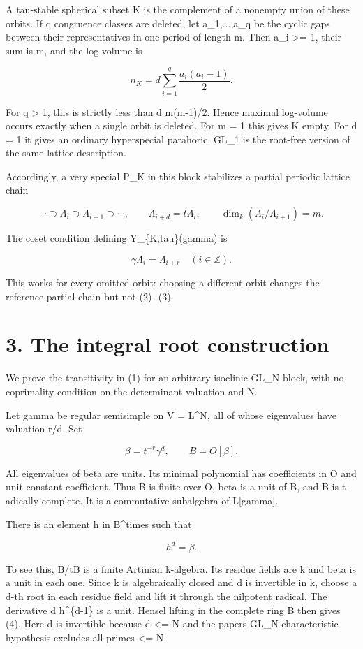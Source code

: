 \documentclass[11pt,a4paper]{article}
\begin{document}
A tau-stable spherical subset K is the complement of a nonempty union of
these orbits. If q congruence classes are deleted, let a\_1,...,a\_q be
the cyclic gaps between their representatives in one period of length m.
Then a\_i \textgreater= 1, their sum is m, and the log-volume is

\[
 n_K=d\sum_{i=1}^q\frac{a_i(a_i-1)}2.
\]

For q \textgreater{} 1, this is strictly less than d m(m-1)/2. Hence
maximal log-volume occurs exactly when a single orbit is deleted. For m
= 1 this gives K empty. For d = 1 it gives an ordinary hyperspecial
parahoric. GL\_1 is the root-free version of the same lattice
description.

Accordingly, a very special P\_K in this block stabilizes a partial
periodic lattice chain

\[
 \cdots\supset\Lambda_i\supset\Lambda_{i+1}\supset\cdots,
 \qquad\Lambda_{i+d}=t\Lambda_i,
 \qquad\dim_k(\Lambda_i/\Lambda_{i+1})=m.
 \tag{2}
\]

The coset condition defining Y\_\{K,tau\}(gamma) is

\[
 \gamma\Lambda_i=\Lambda_{i+r}\quad(i\in\mathbb Z).
 \tag{3}
\]

This works for every omitted orbit: choosing a different orbit changes
the reference partial chain but not (2)-\/-(3).

\section{3. The integral root
construction}\label{the-integral-root-construction}

We prove the transitivity in (1) for an arbitrary isoclinic GL\_N block,
with no coprimality condition on the determinant valuation and N.

Let gamma be regular semisimple on V = L\^{}N, all of whose eigenvalues
have valuation r/d. Set

\[
 \beta=t^{-r}\gamma^d,
 \qquad B=O[\beta].
\]

All eigenvalues of beta are units. Its minimal polynomial has
coefficients in O and unit constant coefficient. Thus B is finite over
O, beta is a unit of B, and B is t-adically complete. It is a
commutative subalgebra of L{[}gamma{]}.

There is an element h in B\^{}times such that

\[
 h^d=\beta.
 \tag{4}
\]

To see this, B/tB is a finite Artinian k-algebra. Its residue fields are
k and beta is a unit in each one. Since k is algebraically closed and d
is invertible in k, choose a d-th root in each residue field and lift it
through the nilpotent radical. The derivative d h\^{}\{d-1\} is a unit.
Hensel lifting in the complete ring B then gives (4). Here d is
invertible because d \textless= N and the paper\textquotesingle s GL\_N
characteristic hypothesis excludes all primes \textless= N.
\end{document}
